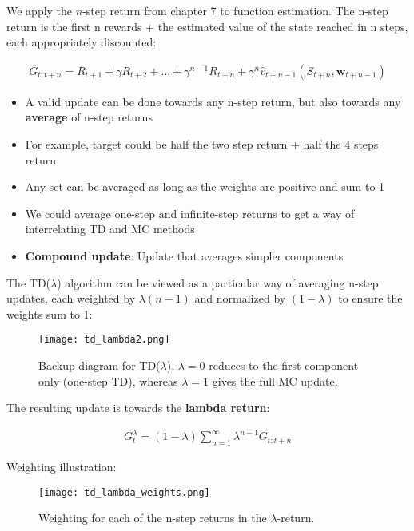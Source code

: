 \documentclass[sutton_barto_notes.tex]{subfiles}
\begin{document}
 We apply the $n$-step return from chapter 7 to function estimation. The n-step return is the first n rewards + the estimated value of the state reached in n steps, each appropriately discounted: 

\begin{align}
G_{t:t+n} = R_{t+1} + \gamma R_{t+2} + ... + \gamma^{n-1} R_{t+n} + \gamma^n \hat{v}_{t+n-1}(S_{t+n}, \mathbf{w}_{t+n-1}) \label{eq:12.1}\tag{12.1}
\end{align}

\begin{itemize}
\item A valid update can be done towards any n-step return, but also towards any \textbf{average} of n-step returns 
\item For example, target could be half the two step return + half the 4 steps return 
\item Any set can be averaged as long as the weights are positive and sum to 1 
\item We could average one-step and infinite-step returns to get a way of interrelating TD and MC methods 
\item \textbf{Compound update}: Update that averages simpler components 
\end{itemize}

 The TD($\lambda$) algorithm can be viewed as a particular way of averaging n-step updates, each weighted by $\lambda{(n-1)}$ and normalized by $(1 - \lambda)$ to ensure the weights sum to 1: 

\begin{figure}[h!]
    \centering
     \texttt{[image: td\_lambda2.png]}
    \caption{ Backup diagram for TD($\lambda$). $\lambda = 0$ reduces to the first component only (one-step TD), whereas $\lambda = 1$ gives the full MC update. }
\end{figure}


 The resulting update is towards the \textbf{lambda return}: 

\begin{align}G_t^{\lambda} = (1 - \lambda) \sum_{n=1}^{\infty} \lambda^{n-1} G_{t:t+n} \label{eq:12.2}\tag{12.2}
\end{align}

\newpage
 Weighting illustration: 
\begin{figure}[h!]
    \centering
     \texttt{[image: td\_lambda\_weights.png]}
    \caption{ Weighting for each of the n-step returns in the $\lambda$-return. }
\end{figure}
\end{document}
